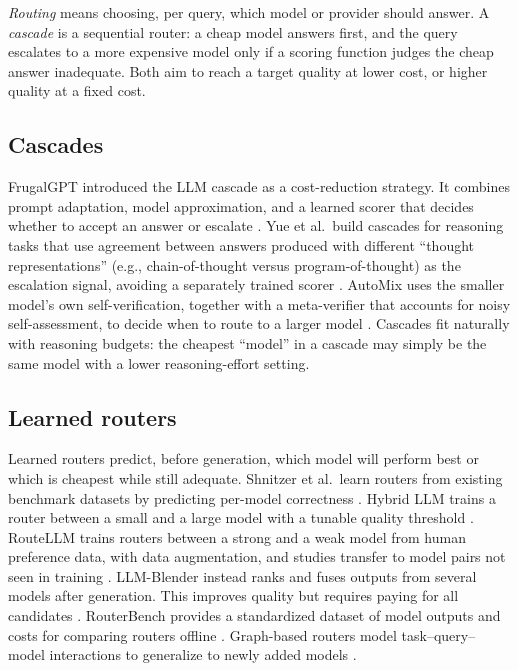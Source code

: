 \documentclass[sigconf]{acmart}
\begin{document}
\emph{Routing} means choosing, per query, which model or provider should answer. A \emph{cascade} is a sequential router: a cheap model answers first, and the query escalates to a more expensive model only if a scoring function judges the cheap answer inadequate. Both aim to reach a target quality at lower cost, or higher quality at a fixed cost.

\subsection{Cascades}\label{cascades}

FrugalGPT introduced the LLM cascade as a cost-reduction strategy. It combines prompt adaptation, model approximation, and a learned scorer that decides whether to accept an answer or escalate \cite{chen2023frugalgpt}. Yue et al.~build cascades for reasoning tasks that use agreement between answers produced with different ``thought representations'' (e.g., chain-of-thought versus program-of-thought) as the escalation signal, avoiding a separately trained scorer \cite{yue2024cascades}. AutoMix uses the smaller model's own self-verification, together with a meta-verifier that accounts for noisy self-assessment, to decide when to route to a larger model \cite{aggarwal2024automix}. Cascades fit naturally with reasoning budgets: the cheapest ``model'' in a cascade may simply be the same model with a lower reasoning-effort setting.

\subsection{Learned routers}\label{learned-routers}

Learned routers predict, before generation, which model will perform best or which is cheapest while still adequate. Shnitzer et al.~learn routers from existing benchmark datasets by predicting per-model correctness \cite{shnitzer2023routing}. Hybrid LLM trains a router between a small and a large model with a tunable quality threshold \cite{ding2024hybrid}. RouteLLM trains routers between a strong and a weak model from human preference data, with data augmentation, and studies transfer to model pairs not seen in training \cite{ong2025routellm}. LLM-Blender instead ranks and fuses outputs from several models after generation. This improves quality but requires paying for all candidates \cite{jiang2023blender}. RouterBench provides a standardized dataset of model outputs and costs for comparing routers offline \cite{hu2024routerbench}. Graph-based routers model task--query--model interactions to generalize to newly added models \cite{feng2025graphrouter}.
\end{document}
